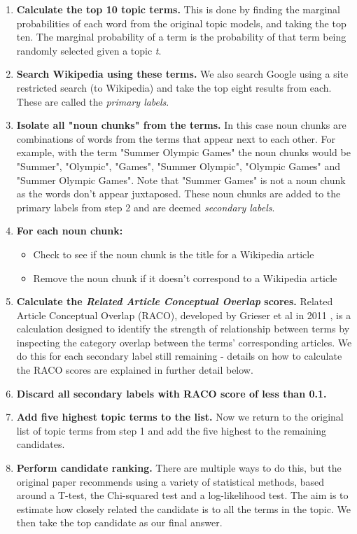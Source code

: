 \documentclass[12pt]{article}
\begin{document}
\begin{enumerate}
	\item \textbf{Calculate the top 10 topic terms.} This is done by finding the marginal probabilities of each word from the original topic models, and taking the top ten. The marginal probability of a term is the probability of that term being randomly selected given a topic \emph{t}. 
	\item \textbf{Search Wikipedia using these terms.} We also search Google \cite{google} using a site restricted search (to Wikipedia) and take the top eight results from each. These are called the \emph{primary labels}. 
	\item \textbf{Isolate all "noun chunks" from the terms.} In this case noun chunks are combinations of words from the terms that appear next to each other. For example, with the term "Summer Olympic Games" the noun chunks would be "Summer", "Olympic", "Games", "Summer Olympic", "Olympic Games" and "Summer Olympic Games". Note that "Summer Games" is not a noun chunk as the words don't appear juxtaposed. These noun chunks are added to the primary labels from step 2 and are deemed \emph{secondary labels}. 
	\item \textbf{For each noun chunk:} 
		\begin{itemize}
			\item Check to see if the noun chunk is the title for a Wikipedia article
			\item Remove the noun chunk if it doesn't correspond to a Wikipedia article
		\end{itemize}
		
	\item \textbf{Calculate the \emph{Related Article Conceptual Overlap} scores.} Related Article Conceptual Overlap (RACO), developed by Grieser et al in 2011 \cite{racoCalculation},  is a calculation designed to identify the strength of relationship between terms by inspecting the category overlap between the terms' corresponding articles. We do this for each secondary label still remaining - details on how to calculate the RACO scores are explained in further detail below. 
	\item \textbf{Discard all secondary labels with RACO  score of less than 0.1.} 
	\item \textbf{Add five highest topic terms to the list.} Now we return to the original list of topic terms from step 1 and add the five highest to the remaining candidates. 
	\item \textbf{Perform candidate ranking.} There are multiple ways to do this, but the original paper recommends using a variety of statistical methods, based around a T-test, the Chi-squared test and a log-likelihood test. The aim is to estimate how closely related the candidate is to all the terms in the topic. We then take the top candidate as our final answer. \\
\end{enumerate}
\end{document}
